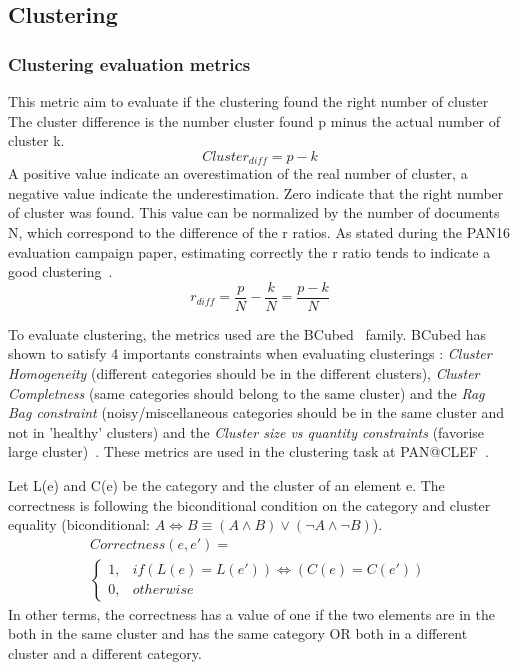\subsection{Clustering}

\subsubsection{Clustering evaluation metrics}

\begin{definition}
  This metric aim to evaluate if the clustering found the right number of cluster
  The cluster difference is the number cluster found p minus the actual number of cluster k.
  \begin{equation}
    Cluster_{diff} = p - k
  \end{equation}
  A positive value indicate an overestimation of the real number of cluster, a negative value indicate the underestimation.
  Zero indicate that the right number of cluster was found.
  This value can be normalized by the number of documents N, which correspond to the difference of the r ratios.
  As stated during the PAN16 evaluation campaign paper, estimating correctly the r ratio tends to indicate a good clustering~\cite{pan16}.
  \begin{equation}
    r_{diff} = \frac{p}{N} - \frac{k}{N} = \frac{p - k}{N}
  \end{equation}
\end{definition}

To evaluate clustering, the metrics used are the BCubed~\cite{bcubed} family.
BCubed has shown to satisfy 4 importants constraints when evaluating clusterings : \textit{Cluster Homogeneity} (different categories should be in the different clusters), \textit{Cluster Completness} (same categories should belong to the same cluster) and the \textit{Rag Bag constraint} (noisy/miscellaneous categories should be in the same cluster and not in 'healthy' clusters) and the \textit{Cluster size vs quantity constraints} (favorise large cluster)~\cite{bcubed}.
These metrics are used in the clustering task at PAN@CLEF~\cite{pan16}.

\begin{definition}
  Let L(e) and C(e) be the category and the cluster of an element e.
  The correctness is following the biconditional condition on the category and cluster equality (biconditional: $A \Longleftrightarrow B \equiv (A \land B) \lor (\neg A \land \neg B)$).
  \begin{gather*}
    Correctness(e, e') = \\
    \begin{cases}
      1, & if (L(e) = L(e')) \Longleftrightarrow (C(e) = C(e'))\\
      0, & otherwise
    \end{cases}
  \end{gather*}
  In other terms, the correctness has a value of one if the two elements are in the both in the same cluster and has the same category OR both in a different cluster and a different category.
\end{definition}

